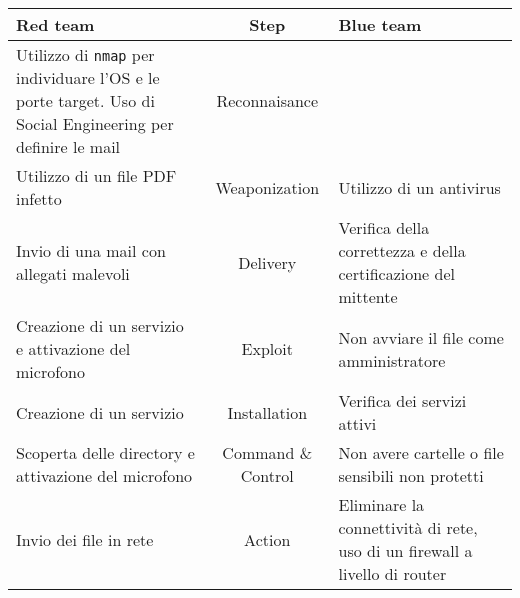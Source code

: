 \begin{table}
    \centering
    \caption{Killchain}
    \label{tab:killchain}

    \begin{longtable}{@{}m{.3\linewidth}c>{\raggedleft\arraybackslash}m{.3\linewidth}@{}}
        \toprule
        Red team                                                                                                         & Step               & Blue team                                                                 \\\midrule
        Utilizzo di \texttt{nmap} per individuare l'OS e le porte target. Uso di Social Engineering per definire le mail & Reconnaisance      &                                                                           \\
        Utilizzo di un file PDF infetto                                                                                  & Weaponization      & Utilizzo di un antivirus                                                  \\
        Invio di una mail con allegati malevoli                                                                          & Delivery           & Verifica della correttezza e della certificazione del mittente            \\
        Creazione di un servizio e attivazione del microfono                                                             & Exploit            & Non avviare il file come amministratore                                   \\
        Creazione di un servizio                                                                                         & Installation       & Verifica dei servizi attivi                                               \\
        Scoperta delle directory e attivazione del microfono                                                             & Command \& Control & Non avere cartelle o file sensibili non protetti                          \\
        Invio dei file in rete                                                                                           & Action             & Eliminare la connettività di rete, uso di un firewall a livello di router \\
        \bottomrule
    \end{longtable}
\end{table}
